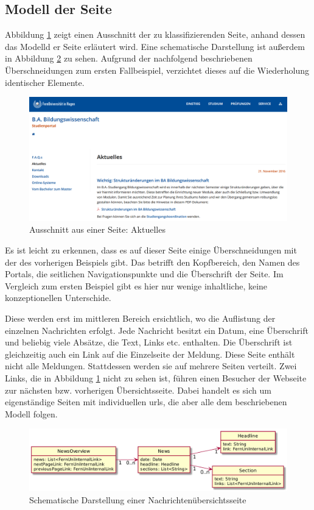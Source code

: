 \subsection{Modell der Seite}
    Abbildung \ref{image:findingNewsModelOverview} zeigt einen
    Ausschnitt der zu klassifizierenden Seite,
    anhand dessen das Modelld er Seite erläutert wird.
    Eine schematische Darstellung ist außerdem in Abbildung
    \ref{image:findingNewsModelUml} zu sehen.
    Aufgrund der nachfolgend beschriebenen Überschneidungen zum
    ersten Fallbeispiel, verzichtet dieses auf die Wiederholung
    identischer Elemente.

    \begin{figure}[htb]
        \centering
        \includegraphics[width=\textwidth]{../resources/findings/case-study-2/news-overview.png}
        \caption{Ausschnitt aus einer Seite: Aktuelles}
        \label{image:findingNewsModelOverview}
    \end{figure}

    Es ist leicht zu erkennen, dass es auf dieser Seite einige Überschneidungen
    mit der des vorherigen Beispiels gibt.
    Das betrifft den Kopfbereich, den Namen des Portals,
    die seitlichen Navigationspunkte und die Überschrift der Seite.
    Im Vergleich zum ersten Beispiel gibt es hier nur wenige inhaltliche,
    keine konzeptionellen Unterschide.

    Diese werden erst im mittleren Bereich ersichtlich,
    wo die Auflistung der einzelnen Nachrichten erfolgt.
    Jede Nachricht besitzt ein Datum, eine Überschrift und beliebig viele Absätze,
    die Text, Links etc. enthalten.
    Die Überschrift ist gleichzeitig auch ein Link auf die Einzelseite der Meldung.
    Diese Seite enthält nicht alle Meldungen.
    Stattdessen werden sie auf mehrere Seiten verteilt.
    Zwei Links, die in Abbildung \ref{image:findingNewsModelOverview} nicht zu sehen ist,
    führen einen Besucher der Webseite zur nächsten bzw. vorherigen Übersichtsseite.
    Dabei handelt es sich um eigenständige Seiten mit individuellen \glspl{url},
    die aber alle dem beschriebenen Modell folgen.

    \begin{figure}[htb]
        \centering
        \includegraphics[scale=\imageScalingFactor]{../resources/findings/case-study-2/model.png}
        \caption{Schematische Darstellung einer Nachrichtenübersichtsseite}
        \label{image:findingNewsModelUml}
    \end{figure}